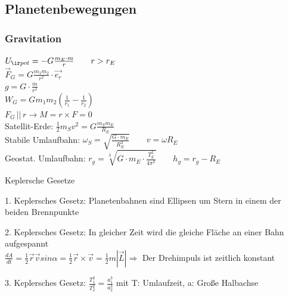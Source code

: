 \documentclass[german]{latex4ei/latex4ei_sheet}
\begin{document}
\begin{sectionbox}
\subsection{Planetenbewegungen}
\subsubsection{Gravitation}
$U_{\ir pot}=-G\frac{m_E\cdot m}{r} \qquad r>r_E$\\
$\vec{F}_G=G\frac{m_1m_2}{r^2}\cdot \vec{e_r}$\\
$g=G\cdot \frac{m}{r^2}$\\
$W_G=Gm_1m_2(\frac{1}{r_1}-\frac{1}{r_2})$\\
$F_G \, || \, r \rightarrow M=r\times F=0$\\

Satellit-Erde: $\frac{1}{2}m_Sv^2=G\frac{m_Sm_E}{R_E}$ \\
Stabile Umlaufbahn: $\omega_S=\sqrt{\frac{G\cdot m_E}{R_E^3}}\qquad v=\omega R_E$\\
Geostat. Umlaufbahn: $r_g=\sqrt[3]{G\cdot m_E \cdot \frac{T_g^2}{4\pi^2}} \qquad h_g=r_g-R_E$

\begin{cookbox}{Keplersche Gesetze}
\item[1.] Keplersches Gesetz: Planetenbahnen sind Ellipsen um Stern in einem der beiden Brennpunkte
\item[2.] Keplersches Gesetz: In gleicher Zeit wird die gleiche Fläche an einer Bahn aufgespannt\\$\frac{dA}{dt} = \frac{1}{2} \vec {r} \vec {v} sin \alpha = \frac{1}{2}\vec {r} \times \vec {v} = \frac{1}{2}m|\vec {L}| \Rightarrow$ Der Drehimpuls ist zeitlich konstant
\item[3.] Keplersches Gesetz: $\frac{T_1^2}{T_2^2} = \frac{a_1^3}{a_2^3}$ mit T: Umlaufzeit, a: Große Halbachse
\end{cookbox}
\end{sectionbox}
\end{document}
